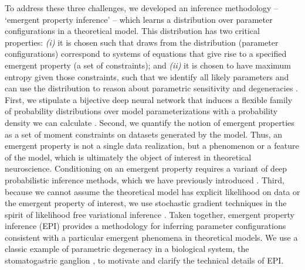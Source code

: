 \documentclass[11pt]{article}
\begin{document}
To address these three challenges, we developed an inference methodology -- `emergent property inference' -- which learns a distribution over parameter configurations in a theoretical model.  
This distribution has two critical properties: \emph{(i)} it is chosen such that draws from the distribution (parameter configurations) correspond to systems of equations that give rise to a specified emergent property (a set of constraints); and \emph{(ii)} it is chosen to have maximum entropy given those constraints, such that we identify all likely parameters and can use the distribution to reason about parametric sensitivity and degeneracies \cite{transtrum2015perspective}.  
First, we stipulate a bijective deep neural network that induces a flexible family of probability distributions over model parameterizations with a probability density we can calculate \cite{rezende2015variational, dinh2016density, papamakarios2017masked}.
Second, we quantify the notion of emergent properties as a set of moment constraints on datasets generated by the model.  
Thus, an emergent property is not a single data realization, but a phenomenon or a feature of the model, which is ultimately the object of interest in theoretical neuroscience.
Conditioning on an emergent property requires a variant of deep probabilistic inference methods, which we have previously introduced \cite{loaiza2017maximum}.
Third,  because we cannot assume the theoretical model has explicit likelihood on data or the emergent property of interest, we use stochastic gradient techniques in the spirit of likelihood free variational inference \cite{tran2017hierarchical}.    
Taken together, emergent property inference (EPI) provides a methodology for inferring parameter configurations consistent with a particular emergent phenomena in theoretical models.
We use a classic example of parametric degeneracy in a biological system, the stomatogastric ganglion \cite{goldman2001global}, to motivate and clarify the technical details of EPI.
\end{document}
